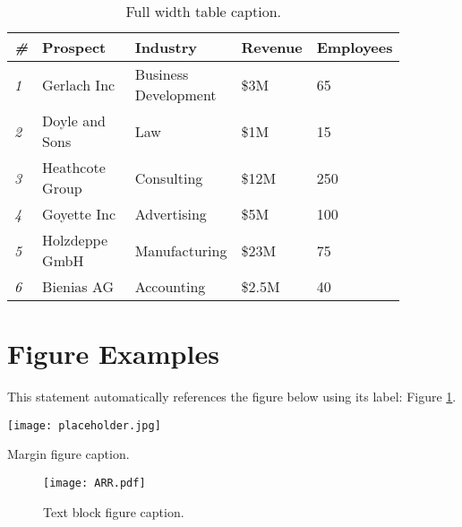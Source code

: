 \documentclass[
	a4paper, %
	12pt, %
]{CSSullivanBusinessReport}
\begin{document}
\begin{table*} %
	\caption{Full width table caption.}
	\begin{tabular}{C{0.03\linewidth} L{0.25\linewidth} L{0.27\linewidth} L{0.16\linewidth} L{0.16\linewidth}}
		\toprule
		\textit{\#} & \textbf{Prospect} & \textbf{Industry} & \textbf{Revenue} & \textbf{Employees} \\
		\midrule
		\textit{1} & Gerlach Inc & Business Development & \$3M & 65\\
		\textit{2} & Doyle and Sons & Law & \$1M & 15\\
		\textit{3} & Heathcote Group & Consulting & \$12M & 250\\
		\textit{4} & Goyette Inc & Advertising & \$5M & 100\\
		\textit{5} & Holzdeppe GmbH & Manufacturing & \$23M & 75\\
		\textit{6} & Bienias AG & Accounting & \$2.5M & 40\\
		\bottomrule
	\end{tabular}
\end{table*}


\section{Figure Examples}

This statement automatically references the figure below using its label: Figure \ref{fig:example}.


\begin{marginfigure} %
	\texttt{[image: placeholder.jpg]}
	\caption{Margin figure caption.}
\end{marginfigure}


\begin{figure}[H] %
	\texttt{[image: ARR.pdf]}
	\caption{Text block figure caption.}
	\label{fig:example} %
\end{figure}
\end{document}
